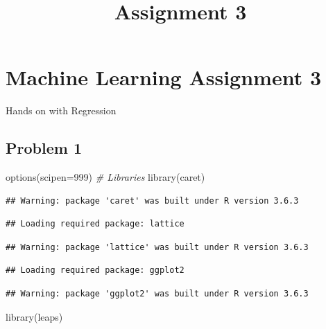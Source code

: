 \documentclass[]{article}
\title{Assignment 3}
\author{}
\date{}
\newenvironment{Shaded}{\begin{snugshade}}{\end{snugshade}}
\newcommand{\AttributeTok}[1]{\textcolor[rgb]{0.77,0.63,0.00}{#1}}
\newcommand{\CommentTok}[1]{\textcolor[rgb]{0.56,0.35,0.01}{\textit{#1}}}
\newcommand{\DecValTok}[1]{\textcolor[rgb]{0.00,0.00,0.81}{#1}}
\newcommand{\FunctionTok}[1]{\textcolor[rgb]{0.00,0.00,0.00}{#1}}
\newcommand{\NormalTok}[1]{#1}
\begin{document}
\maketitle

\hypertarget{machine-learning-assignment-3}{%
\section{Machine Learning Assignment
3}\label{machine-learning-assignment-3}}

Hands on with Regression

\hypertarget{problem-1}{%
\subsection{Problem 1}\label{problem-1}}

\begin{Shaded}
\begin{Highlighting}[]
\FunctionTok{options}\NormalTok{(}\AttributeTok{scipen=}\DecValTok{999}\NormalTok{)}
\CommentTok{\# Libraries}
\FunctionTok{library}\NormalTok{(caret)}
\end{Highlighting}
\end{Shaded}

\begin{verbatim}
## Warning: package 'caret' was built under R version 3.6.3
\end{verbatim}

\begin{verbatim}
## Loading required package: lattice
\end{verbatim}

\begin{verbatim}
## Warning: package 'lattice' was built under R version 3.6.3
\end{verbatim}

\begin{verbatim}
## Loading required package: ggplot2
\end{verbatim}

\begin{verbatim}
## Warning: package 'ggplot2' was built under R version 3.6.3
\end{verbatim}

\begin{Shaded}
\begin{Highlighting}[]
\FunctionTok{library}\NormalTok{(leaps)}
\end{Highlighting}
\end{Shaded}
\end{document}
